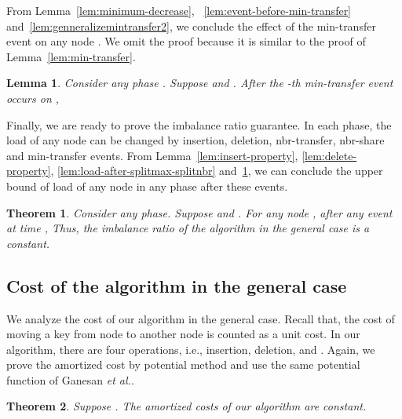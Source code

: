 \documentclass[a4paper]{article}
\newtheorem{theorem}{Theorem}
\newtheorem{lemma}{Lemma}
\begin{document}
From Lemma~\ref{lem:minimum-decrease},
~\ref{lem:event-before-min-transfer}
and~\ref{lem:genneralizemintransfer2}, we conclude the effect of the
min-transfer event on any node . We omit the proof because it is
similar to the proof of Lemma~\ref{lem:min-transfer}.

\begin{lemma}
  \label{lem:min-transfer-general}
  Consider any phase .  Suppose  and . After the -th min-transfer event occurs on
  , 
\end{lemma}

Finally, we are ready to prove the imbalance ratio guarantee. In each
phase, the load of any node can be changed by insertion, deletion,
nbr-transfer, nbr-share and min-transfer events.  From
Lemma~\ref{lem:insert-property}, \ref{lem:delete-property},
\ref{lem:load-after-splitmax-splitnbr}
and~\ref{lem:min-transfer-general},  we can conclude the upper bound of
load of any node in any phase after these events.

\begin{theorem}\label{thm:maxload2}
  Consider any phase. Suppose  and . For any node , after any event at time
  ,  Thus, the imbalance ratio
  of the algorithm in the general case is a constant.
\end{theorem}	

\subsection{Cost of the algorithm in the general case}
\label{sect:imbalanceratioproof2}

We analyze the cost of our algorithm in the general case. Recall that, the
cost of moving a key from node  to another node  is counted as a unit
cost. In our algorithm, there are four operations, i.e., insertion,
deletion, {\minbalance} and {\split}. Again, we prove the amortized
cost by potential method and use the same potential function of
Ganesan {\em et al.}.

\begin{theorem}\label{thm:amortized_cost} 
 Suppose .  The amortized costs of our algorithm are constant.
\end{theorem}
\end{document}
